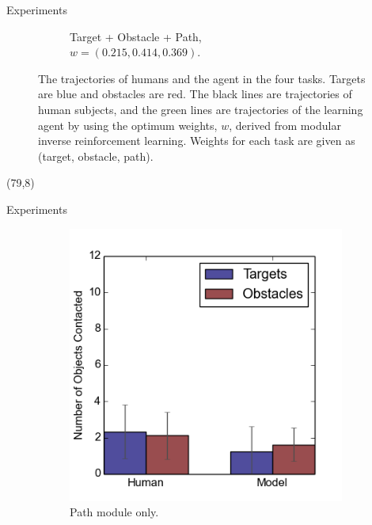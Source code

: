 \documentclass[final]{beamer}
\begin{document}
\begin{frame}{}
\begin{textblock}{37}
\begin{block}{Experiments}
\begin{figure}[h]
\begin{subfigure}[b]{0.4\textwidth}
\caption{Target + Obstacle + Path, \\$w = (0.215, 0.414, 0.369)$. }
\end{subfigure}
\caption{The trajectories of humans and the agent in the four tasks. Targets are blue and obstacles are red. The
black lines are trajectories of human subjects, and the green lines are
trajectories of the learning agent by using the optimum weights, $w$, derived
from modular inverse reinforcement learning. Weights for each task are given as (target,
obstacle, path).}
\label{fig:exp}
\end{figure}

\end{block}
\end{textblock}

\begin{textblock}{37}(79,8)
\begin{block}{Experiments}
\begin{figure}[h]
\centering
\begin{subfigure}[b]{0.24\textwidth}
\includegraphics[width=\textwidth]{contact1.png}
\caption{Path module only.}
\end{subfigure}
\begin{subfigure}[b]{0.24\textwidth}

\end{subfigure}
\end{figure}
\end{block}
\end{textblock}
\end{frame}
\end{document}
